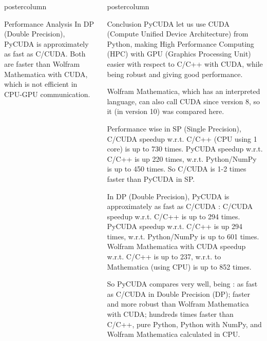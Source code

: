 \documentclass[final,hyperref={pdfpagelabels=false}]{beamer}
\newlength{\columnheight}
\begin{document}
\begin{frame}
\begin{columns}
\begin{column}{.49\textwidth}
\begin{beamercolorbox}[center,wd=\textwidth]{postercolumn}
\begin{minipage}[T]{.95\textwidth}
{\begin{block}{Performance Analysis}
               In DP (Double Precision), PyCUDA is approximately as fast as C/CUDA. Both are faster than Wolfram Mathematica with CUDA, which is not efficient in CPU-GPU communication.
            \end{block}
          }
        \end{minipage}
      \end{beamercolorbox}
    \end{column}
    \begin{column}{.245\textwidth}
      \begin{beamercolorbox}[center,wd=\textwidth]{postercolumn}
        \begin{minipage}[T]{.95\textwidth} %
          \parbox[t][\columnheight]{\textwidth}{ %
             \begin{block}{Conclusion}
               PyCUDA let us use CUDA (Compute Unified Device Architecture) from Python, making High Performance Computing (HPC) with GPU (Graphics Processing Unit) easier with respect to C/C++ with CUDA, while being robust and giving good performance.
               
               Wolfram Mathematica, which has an interpreted language, can also call CUDA since version 8, so it (in version 10) was compared here.
			   
			   Performance wise in SP (Single Precision), C/CUDA speedup w.r.t. C/C++ (CPU using 1 core) is up to 730 times. PyCUDA speedup w.r.t. C/C++ is up 220 times, w.r.t. Python/NumPy is up to 450 times. So C/CUDA is 1-2 times faster than PyCUDA in SP.
               
               In DP (Double Precision), PyCUDA is approximately as fast as C/CUDA : C/CUDA speedup w.r.t. C/C++ is up to 294 times. PyCUDA speedup w.r.t. C/C++ is up 294 times, w.r.t. Python/NumPy is up to 601 times. Wolfram Mathematica with CUDA speedup w.r.t. C/C++ is up to 237, w.r.t. to Mathematica (using CPU) is up to 852 times.
               
               So PyCUDA compares very well, being : as fast as C/CUDA in Double Precision (DP); faster and more robust than Wolfram Mathematica with CUDA; hundreds times faster than C/C++, pure Python, Python with NumPy, and Wolfram Mathematica calculated in CPU.
               

\end{block}}
\end{minipage}
\end{beamercolorbox}
\end{column}
\end{columns}
\end{frame}
\end{document}
